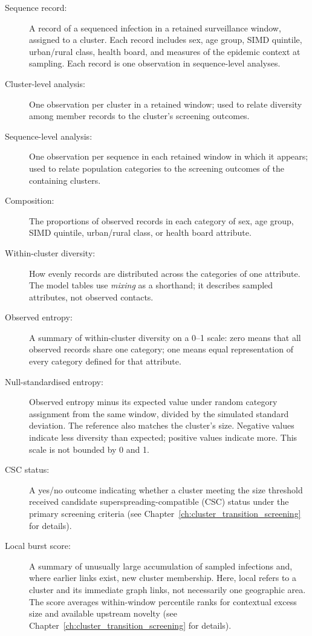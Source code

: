 \begin{tcolorbox}[
    breakable,
    title=\textbf{Glossary}: key terms used in this chapter,
    halign=right, 
    fontupper=\small
    ]
\begin{description}
    \item[Sequence record:] A record of a sequenced infection in a retained surveillance window, assigned to a cluster. Each record includes sex, age group, SIMD quintile, urban/rural class, health board, and measures of the epidemic context at sampling. Each record is one observation in sequence-level analyses.
    \item[Cluster-level analysis:] One observation per cluster in a retained window; used to relate diversity among member records to the cluster's screening outcomes.
    \item[Sequence-level analysis:] One observation per sequence in each retained window in which it appears; used to relate population categories to the screening outcomes of the containing clusters.
    \item[Composition:] The proportions of observed records in each category of sex, age group, SIMD quintile, urban/rural class, or health board attribute.
    \item[Within-cluster diversity:] How evenly records are distributed across the categories of one attribute. The model tables use \emph{mixing} as a shorthand; it describes sampled attributes, not observed contacts.
    \item[Observed entropy:] A summary of within-cluster diversity on a 0--1 scale: zero means that all observed records share one category; one means equal representation of every category defined for that attribute.
    \item[Null-standardised entropy:] Observed entropy minus its expected value under random category assignment from the same window, divided by the simulated standard deviation. The reference also matches the cluster's size. Negative values indicate less diversity than expected; positive values indicate more. This scale is not bounded by 0 and 1.
    \item[CSC status:] A yes/no outcome indicating whether a cluster meeting the size threshold received candidate superspreading-compatible (CSC) status under the primary screening criteria (see Chapter~\ref{ch:cluster_transition_screening} for details).
    \item[Local burst score:] A summary of unusually large accumulation of sampled infections and, where earlier links exist, new cluster membership. Here, local refers to a cluster and its immediate graph links, not necessarily one geographic area. The score averages within-window percentile ranks for contextual excess size and available upstream novelty (see Chapter~\ref{ch:cluster_transition_screening} for details).

\end{description}
\end{tcolorbox}
